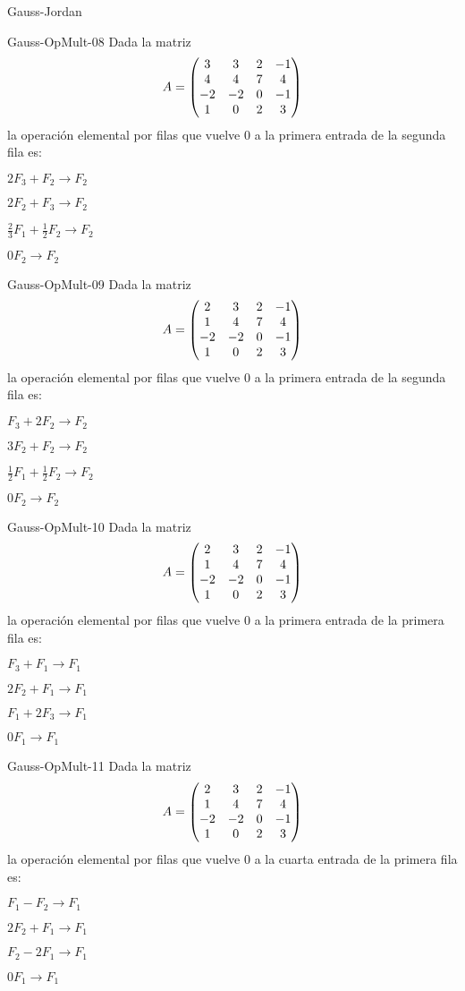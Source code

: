 \documentclass[a4,11pt]{aleph-notas}
\begin{document}
\begin{quiz}{Gauss-Jordan}
\begin{multi}{Gauss-OpMult-08}
    Dada la matriz
    \[
        A= \begin{pmatrix} 3 & 3 & 2 & -1 \cr 4 & 4 & 7 & 4  \cr -2 & -2 & 0 & -1 \cr 1 & 0 & 2 & 3\end{pmatrix} 
    \] la operación elemental por filas que vuelve $0$ a la primera entrada de la segunda fila es:
    \item* $2F_3+F_2\to F_2$
    \item $2F_2+F_3\to F_2$
    \item $\frac{2}{3}F_1+\frac{1}{2}F_2\to F_2$
    \item $0F_2\to F_2$
\end{multi}

\begin{multi}{Gauss-OpMult-09}
    Dada la matriz
    \[
        A= \begin{pmatrix} 2 & 3 & 2 & -1 \cr 1 & 4 & 7 & 4  \cr -2 & -2 & 0 & -1 \cr 1 & 0 & 2 & 3\end{pmatrix} 
    \] la operación elemental por filas que vuelve $0$ a la primera entrada de la segunda fila es:
    \item* $F_3+2F_2\to F_2$
    \item $3F_2+F_2\to F_2$
    \item $\frac{1}{2}F_1+\frac{1}{2}F_2\to F_2$
    \item $0F_2\to F_2$
\end{multi}

\begin{multi}{Gauss-OpMult-10}
    Dada la matriz
    \[
        A= \begin{pmatrix} 2 & 3 & 2 & -1 \cr 1 & 4 & 7 & 4  \cr -2 & -2 & 0 & -1 \cr 1 & 0 & 2 & 3\end{pmatrix} 
    \] la operación elemental por filas que vuelve $0$ a la primera entrada de la primera fila es:
    \item* $F_3+F_1\to F_1$
    \item $2F_2+F_1\to F_1$
    \item $F_1+2F_3\to F_1$
    \item $0F_1\to F_1$
\end{multi}

\begin{multi}{Gauss-OpMult-11}
    Dada la matriz
    \[
        A= \begin{pmatrix} 2 & 3 & 2 & -1 \cr 1 & 4 & 7 & 4  \cr -2 & -2 & 0 & -1 \cr 1 & 0 & 2 & 3\end{pmatrix} 
    \] la operación elemental por filas que vuelve $0$ a la cuarta entrada de la primera fila es:
    \item* $F_1-F_2\to F_1$
    \item $2F_2+F_1\to F_1$
    \item $F_2-2F_1\to F_1$
    \item $0F_1\to F_1$
\end{multi}


\end{quiz}
\end{document}
